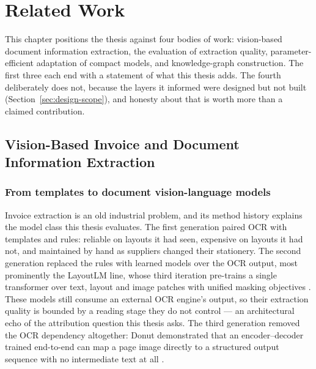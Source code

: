 \chapter{Related Work}
\label{ch:related-work}

This chapter positions the thesis against four bodies of work: vision-based document
information extraction, the evaluation of extraction quality, parameter-efficient
adaptation of compact models, and knowledge-graph construction. The first three each end
with a statement of what this thesis adds. The fourth deliberately does not, because the
layers it informed were designed but not built (Section~\ref{sec:design-scope}), and honesty
about that is worth more than a claimed contribution.

\section{Vision-Based Invoice and Document Information Extraction}
\label{sec:rw-extraction}

\subsection{From templates to document vision-language models}

Invoice extraction is an old industrial problem, and its method history explains the model
class this thesis evaluates. The first generation paired \ac{OCR} with templates and rules:
reliable on layouts it had seen, expensive on layouts it had not, and maintained by hand as
suppliers changed their stationery. The second generation replaced the rules with learned
models over the \ac{OCR} output, most prominently the LayoutLM line, whose third iteration
pre-trains a single transformer over text, layout and image patches with unified masking
objectives \parencite{huang2022layoutlmv3}. These models still consume an external \ac{OCR}
engine's output, so their extraction quality is bounded by a reading stage they do not
control --- an architectural echo of the attribution question this thesis asks. The third
generation removed the \ac{OCR} dependency altogether: Donut demonstrated that an
encoder--decoder trained end-to-end can map a page image directly to a structured output
sequence with no intermediate text at all \parencite{kim2022donut}.


